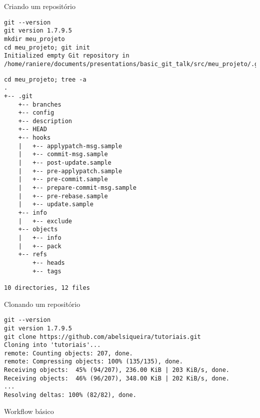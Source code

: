 \documentclass[11pt]{beamer}
\begin{document}
\begin{frame}[fragile]{Criando um repositório}
    \begin{lstlisting}
git --version
git version 1.7.9.5
mkdir meu_projeto
cd meu_projeto; git init
Initialized empty Git repository in /home/raniere/documents/presentations/basic_git_talk/src/meu_projeto/.git/
    \end{lstlisting}
\end{frame}

\begin{frame}[fragile]
    \begin{lstlisting}
cd meu_projeto; tree -a
.
+-- .git
    +-- branches
    +-- config
    +-- description
    +-- HEAD
    +-- hooks
    |   +-- applypatch-msg.sample
    |   +-- commit-msg.sample
    |   +-- post-update.sample
    |   +-- pre-applypatch.sample
    |   +-- pre-commit.sample
    |   +-- prepare-commit-msg.sample
    |   +-- pre-rebase.sample
    |   +-- update.sample
    +-- info
    |   +-- exclude
    +-- objects
    |   +-- info
    |   +-- pack
    +-- refs
        +-- heads
        +-- tags

10 directories, 12 files
    \end{lstlisting}
\end{frame}

\begin{frame}[fragile]{Clonando um repositório}
    \begin{lstlisting}
git --version
git version 1.7.9.5
git clone https://github.com/abelsiqueira/tutoriais.git
Cloning into 'tutoriais'...
remote: Counting objects: 207, done.
remote: Compressing objects: 100% (135/135), done.
Receiving objects:  45% (94/207), 236.00 KiB | 203 KiB/s, done.
Receiving objects:  46% (96/207), 348.00 KiB | 202 KiB/s, done.
...
Resolving deltas: 100% (82/82), done.
    \end{lstlisting}
\end{frame}

\begin{frame}{Workflow básico}
    \begin{center}
    \end{center}
\end{frame}
\end{document}
